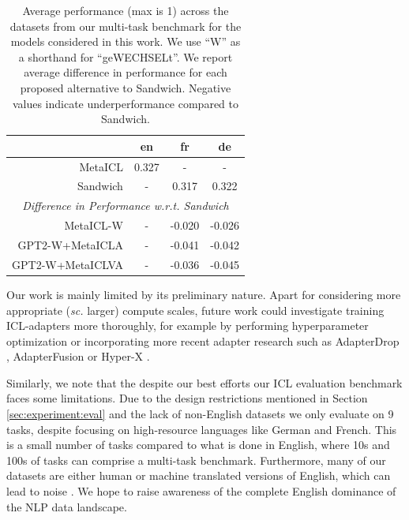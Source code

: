\documentclass[11pt]{article}
\begin{document}
\begin{table}[ht]
	\centering
	\caption{Average performance (max is 1) across the datasets from our multi-task benchmark for the
		models considered in this work. We use ``W'' as a shorthand for ``geWECHSELt''. We report average
		difference in performance for each proposed alternative to Sandwich. Negative values indicate
		underperformance compared to Sandwich.}
	\label{tab:results-summary}
	\begin{tabular}{@{}rccc@{}}
		\toprule
		\multicolumn{1}{c}{} & en    & fr     & de                             \\ \midrule
		MetaICL              & 0.327 & -      & -                              \\
		Sandwich             & -     & 0.317  & 0.322                          \\ \midrule
		\multicolumn{4}{c}{\textit{Difference in Performance w.r.t. Sandwich}} \\
		MetaICL-W            & -     & -0.020 & -0.026                         \\
		GPT2-W+MetaICLA      & -     & -0.041 & -0.042                         \\
		GPT2-W+MetaICLVA     & -     & -0.036 & -0.045                         \\ \bottomrule
	\end{tabular}
\end{table}

Our work is mainly limited by its preliminary nature. Apart for considering more appropriate
(\textit{sc.} larger) compute scales, future work could investigate training ICL-adapters more
thoroughly, for example by performing hyperparameter optimization or incorporating more recent
adapter research such as AdapterDrop \citep{ruckle_adapterdrop_2021}, AdapterFusion
\citep{pfeiffer_adapterfusion_2021} or Hyper-X \citep{ustun_hyper-x_2022}.

Similarly, we note that the despite our best efforts our ICL evaluation benchmark faces some
limitations. Due to the design restrictions mentioned in Section \ref{sec:experiment:eval} and the
lack of non-English datasets we only evaluate on 9 tasks, despite focusing on high-resource
languages like German and French. This is a small number of tasks compared to what is done in
English, where 10s and 100s of tasks can comprise a multi-task benchmark. Furthermore, many of our
datasets are either human or machine translated versions of English, which can lead to noise
\citep{koppel_translationese_2011}. We hope to raise awareness of the complete English dominance of
the NLP data landscape.
\end{document}
